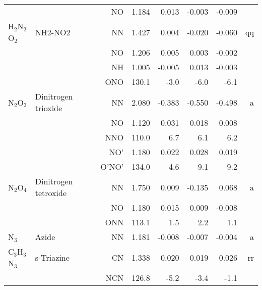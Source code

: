 \begin{table}
\begin{center}
\begin{tabular}{llrrrrrr}
             &                                    &NO            &     1.184   &     0.013 &    -0.003 &    -0.009 &       \\
 H$_2$N$_2$O$_2$      & NH2-NO2                            &NN            &     1.427   &     0.004 &    -0.020 &    -0.060 &    qq \\
             &                                    &NO            &     1.206   &     0.005 &     0.003 &    -0.002 &       \\
             &                                    &NH            &     1.005   &    -0.005 &     0.013 &    -0.003 &       \\
             &                                    &ONO         &     130.1   &      -3.0 &      -6.0 &      -6.1   &       \\
 N$_2$O$_3$        & Dinitrogen trioxide                &NN            &     2.080   &    -0.383 &    -0.550 &    -0.498 &     a \\
             &                                    &NO            &     1.120   &     0.031 &     0.018 &     0.008 &       \\
             &                                    &NNO         &     110.0   &       6.7 &       6.1 &       6.2   &       \\
             &                                    &NO'           &     1.180   &     0.022 &     0.028 &     0.019 &       \\
             &                                    &O'NO'       &     134.0   &      -4.6 &      -9.1 &      -9.2   &       \\
 N$_2$O$_4$        & Dinitrogen tetroxide               &NN            &     1.750   &     0.009 &    -0.135 &     0.068 &     a \\
             &                                    &NO            &     1.180   &     0.015 &     0.009 &    -0.008 &       \\
             &                                    &ONN         &     113.1   &       1.5 &       2.2 &       1.1   &       \\
 N$_3$          & Azide                              &NN            &     1.181   &    -0.008 &    -0.007 &    -0.004 &     a \\
 C$_3$H$_3$N$_3$      & s-Triazine                         &CN            &     1.338   &     0.020 &     0.019 &     0.026 &    rr \\
             &                                    &NCN         &     126.8   &      -5.2 &      -3.4 &      -1.1   &       \\

\end{tabular}
\end{center}
\end{table}
